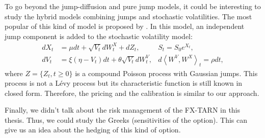 To go beyond the jump-diffusion and pure jump models, it could be interesting to study the hybrid models combining jumps and stochastic volatilities. The most popular of this kind of model is proposed by \citeauthor{Bat96} \citeyearpar{Bat96}. In this model, an independent jump component is added to the \citeauthor{Hes93} stochastic volatility model:
\begin{align*}
dX_t &= \mu dt + \sqrt{V_t}dW_t^X+dZ_t, &S_t = S_0e^{X_t},\\
dV_t &= \xi\left(\eta-V_t\right)dt+\theta\sqrt{V_t}dW_t^V, &d\left\langle W^V,W^X\right\rangle_t=\rho dt,
\end{align*}
where $Z=\{Z_t,t\geq 0\}$ is a compound Poisson process with Gaussian jumps. This process is not a L\'evy process but its characteristic function is still known in closed form. Therefore, the pricing and the calibration is similar to our approach. 

Finally, we didn't talk about the risk management of the FX-TARN in this thesis. Thus, we  could study the Greeks (sensitivities of the option). This can give us an idea about the hedging of this kind of option.